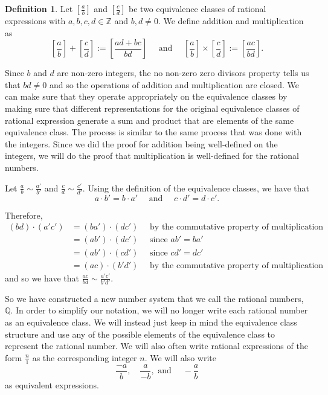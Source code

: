 \documentclass[
]{book}
\theoremstyle{definition}
\newtheorem{definition}{Definition}[chapter]
\theoremstyle{definition}
\theoremstyle{definition}
\theoremstyle{remark}
\begin{document}
\begin{definition}
\protect\hypertarget{def:unnamed-chunk-94}{}{\label{def:unnamed-chunk-94} }Let \(\left[\frac{a}{b}\right]\) and \(\left[\frac{c}{d}\right]\) be two equivalence classes of rational expressions with \(a,b,c,d\in \mathbb{Z}\) and \(b,d\neq 0\). We define addition and multiplication as
\[\left[\frac{a}{b}\right] + \left[\frac{c}{d}\right] := \left[\frac{ad+bc}{bd}\right] \quad \mbox{ and } \quad \left[\frac{a}{b}\right] \times \left[\frac{c}{d}\right] := \left[ \frac{ac}{bd} \right].\]
\end{definition}

Since \(b\) and \(d\) are non-zero integers, the no non-zero zero divisors property tells us that \(bd\neq 0\) and so the operations of addition and multiplication are closed. We can make sure that they operate appropriately on the equivalence classes by making sure that different representations for the original equivalence classes of rational expression generate a sum and product that are elements of the same equivalence class. The process is similar to the same process that was done with the integers. Since we did the proof for addition being well-defined on the integers, we will do the proof that multiplication is well-defined for the rational numbers.

Let \(\frac{a}{b}\sim \frac{a'}{b'}\) and \(\frac{c}{d} \sim \frac{c'}{d'}\). Using the definition of the equivalence classes, we have that \[a\cdot b' = b \cdot a' \quad \mbox{ and } \quad c \cdot d' = d \cdot c'.\]

Therefore,
\begin{align*}
    (bd)\cdot (a'c') &= (ba') \cdot (dc') \quad \mbox{ by the commutative property of multiplication} \\
    &= (ab') \cdot (dc') \quad \mbox{ since } ab' = ba' \\
    &= (ab') \cdot (cd') \quad \mbox{ since } cd'=dc' \\
    &= (ac) \cdot (b'd') \quad \mbox{ by the commutative property of multiplication}
\end{align*}
and so we have that \(\frac{ac}{bd} \sim \frac{a'c'}{b'd'}\).

So we have constructed a new number system that we call the rational numbers, \(\mathbb{Q}\). In order to simplify our notation, we will no longer write each rational number as an equivalence class. We will instead just keep in mind the equivalence class structure and use any of the possible elements of the equivalence class to represent the rational number. We will also often write rational expressions of the form \(\frac{n}{1}\) as the corresponding integer \(n\). We will also write
\[\frac{-a}{b}, \quad \frac{a}{-b}, \mbox{ and }\quad -\frac{a}{b} \] as equivalent expressions.
\end{document}
